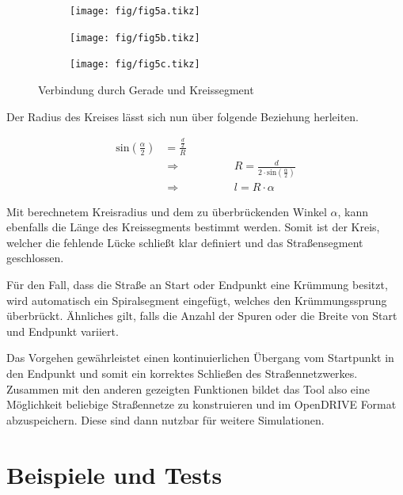 \begin{figure}[H]
\flushleft
\begin{subfigure}{0.32\textwidth}
\texttt{[image: fig/fig5a.tikz]}
\end{subfigure}
\begin{subfigure}{0.32\textwidth}
    \texttt{[image: fig/fig5b.tikz]}
\end{subfigure}
\begin{subfigure}{0.32\textwidth}
    \texttt{[image: fig/fig5c.tikz]}
\end{subfigure}
\caption{Verbindung durch Gerade und Kreissegment}
\label{abb5}
\end{figure}

Der Radius des Kreises lässt sich nun über folgende Beziehung herleiten.

\begin{align}
\text{sin}(\frac{\alpha}{2}) &= \frac{\frac{d}{2}}{R} \\
&\Rightarrow \hspace{2cm} R = \frac{d}{2 \cdot \text{sin}(\frac{\alpha}{2})} \\
&\Rightarrow \hspace{2cm} l = R \cdot \alpha
\end{align}

Mit berechnetem Kreisradius und dem zu überbrückenden Winkel \(\alpha\), kann  ebenfalls die Länge des Kreissegments bestimmt werden. Somit ist der Kreis, welcher die fehlende Lücke schließt klar definiert und das Straßensegment geschlossen.

Für den Fall, dass die Straße an Start oder Endpunkt eine Krümmung besitzt, wird automatisch ein Spiralsegment eingefügt, welches den Krümmungssprung überbrückt. Ähnliches gilt, falls die Anzahl der Spuren oder die Breite von Start und Endpunkt variiert.

Das Vorgehen gewährleistet einen kontinuierlichen Übergang vom Startpunkt in den Endpunkt und somit ein korrektes Schließen des Straßennetzwerkes. Zusammen mit den anderen gezeigten Funktionen bildet das Tool also eine Möglichkeit beliebige Straßennetze zu konstruieren und im OpenDRIVE Format abzuspeichern. Diese sind dann nutzbar für weitere Simulationen.

\chapter{Beispiele und Tests}

